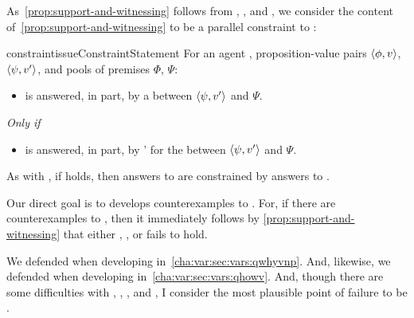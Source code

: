 \begin{note}
  As~\autoref{prop:support-and-witnessing} follows from \linkW{}, \linkH{}, and \issueInclusion{}, we consider the content of~\autoref{prop:support-and-witnessing} to be a parallel constraint to \issueInclusion{}:

  \begin{restatable}[\issueConstraint{}]{constraint}{issueConstraintStatement}
    \label{issue:has-witnessed}
    For an agent \vAgent{}, proposition-value pairs \(\langle \phi, v \rangle\), \(\langle \psi, v' \rangle\), and pools of premises \(\Phi\), \(\Psi\):

    \begin{itemize}
    \item
      \qWhyVnP{} is answered, in part, by a \ros{} between \(\langle \psi, v' \rangle\) and \(\Psi\).
    \end{itemize}

    \emph{Only if}

    \begin{itemize}
    \item
      \qHowV{} is answered, in part, by \vAgent{}'  for the \ros{} between \(\langle \psi, v' \rangle\) and \(\Psi\).
    \end{itemize}
    \vspace{-\baselineskip}
  \end{restatable}

  As with \issueInclusion{}, if \issueConstraint{} holds, then answers to \qWhyVnP{} are constrained by answers to \qHowV{}.

  Our direct goal is to develops counterexamples to \issueConstraint{}.
  For, if there are counterexamples to \issueConstraint{}, then it immediately follows by \autoref{prop:support-and-witnessing} that either \linkW{}, \linkH{}, or \issueInclusion{} fails to hold.

  We defended \linkW{} when developing \qWhyVnP{} in~\autoref{cha:var:sec:vars:qwhyvnp}.
  And, likewise, we defended \linkH{} when developing \qHowV{} in~\autoref{cha:var:sec:vars:qhowv}.
  And, though there are some difficulties with \qWhyVnP{}, \qHowV{}, \linkW{}, and \linkH{}, I consider the most plausible point of failure to be \issueInclusion{}.
\end{note}

